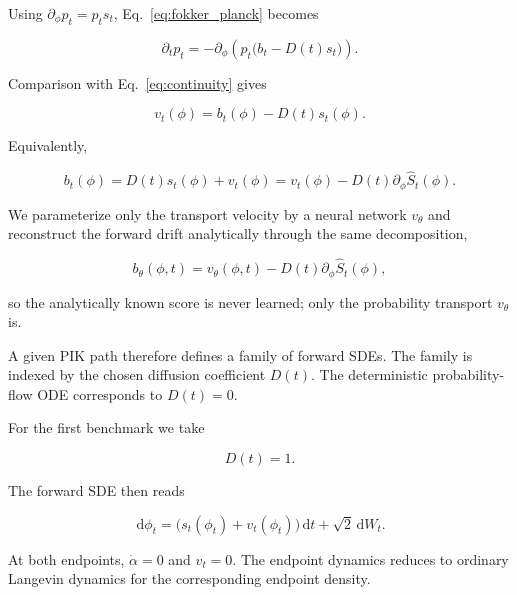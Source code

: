 \documentclass[reprint,twocolumn,superscriptaddress,preprintnumbers,amsmath,amssymb,aps,prd,floatfix]{revtex4-2}
\newcommand{\dd}{\,\mathrm{d}}
\begin{document}
Using $\partial_\phi p_t=p_ts_t$, Eq.~\eqref{eq:fokker_planck} becomes

\begin{equation}
 \partial_t p_t
 =
 -\partial_\phi
 \left(
 p_t\bigl(b_t-D(t)s_t\bigr)
 \right).
\end{equation}

Comparison with Eq.~\eqref{eq:continuity} gives

\begin{equation}
 v_t(\phi)
 =
 b_t(\phi)-D(t)s_t(\phi).
 \label{eq:velocity_drift_relation}
\end{equation}

Equivalently,

\begin{equation}
 b_t(\phi)
 =
 D(t)s_t(\phi)+v_t(\phi)
 =
 v_t(\phi)-D(t)\partial_\phi\hat S_t(\phi).
 \label{eq:drift_decomposition}
\end{equation}

We parameterize only the transport velocity by a neural network $v_\theta$ and
reconstruct the forward drift analytically through the same decomposition,

\begin{equation}
 b_\theta(\phi,t)
 =
 v_\theta(\phi,t)-D(t)\partial_\phi\hat S_t(\phi),
 \label{eq:network_drift_decomposition}
\end{equation}

so the analytically known score is never learned; only the probability transport
$v_\theta$ is.

A given PIK path therefore defines a family of forward SDEs. The family is indexed by the chosen diffusion coefficient $D(t)$. The deterministic probability-flow ODE corresponds to $D(t)=0$.

For the first benchmark we take

\begin{equation}
 D(t)=1.
 \label{eq:constant_diffusion}
\end{equation}

The forward SDE then reads

\begin{equation}
 \dd\phi_t
 =
 \bigl(s_t(\phi_t)+v_t(\phi_t)\bigr)\dd t
 +
 \sqrt{2}\dd W_t.
 \label{eq:forward_sde_unit_diffusion}
\end{equation}

At both endpoints, $\dot\alpha=0$ and $v_t=0$. The endpoint dynamics reduces to ordinary Langevin dynamics for the corresponding endpoint density.
\end{document}
